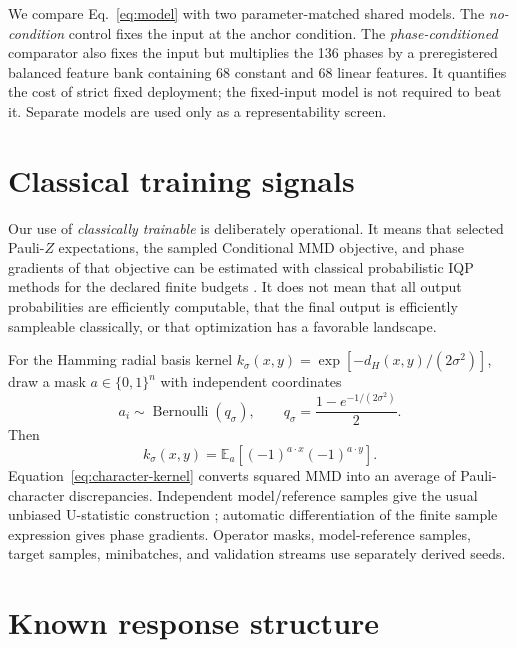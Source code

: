 \documentclass[a4paper,twocolumn,11pt,unpublished]{quantumarticle}
\newcommand{\bits}{\{0,1\}}
\newcommand{\E}{\mathbb{E}}
\begin{document}
We compare Eq.~\eqref{eq:model} with two parameter-matched shared models.  The
\emph{no-condition} control fixes the input at the anchor condition.  The
\emph{phase-conditioned} comparator also fixes the input but multiplies the
136 phases by a preregistered balanced feature bank containing 68 constant and
68 linear features.  It quantifies the cost of strict fixed deployment; the
fixed-input model is not required to beat it.  Separate models are used only as
a representability screen.

\section{Classical training signals}
\label{sec:training}

Our use of \emph{classically trainable} is deliberately operational.  It means
that selected Pauli-$Z$ expectations, the sampled Conditional MMD objective,
and phase gradients of that objective can be estimated with classical
probabilistic IQP methods for the declared finite budgets
\cite{nestSimulatingQuantumComputers2011,
recio-armengolIQPoptFastOptimization2025,
recio-armengolTrainClassicalDeploy2026}.  It does not mean that all output
probabilities are efficiently computable, that the final output is efficiently
sampleable classically, or that optimization has a favorable landscape.

For the Hamming radial basis kernel
$k_\sigma(x,y)=\exp[-d_H(x,y)/(2\sigma^2)]$, draw a mask
$a\in\bits^n$ with independent coordinates
\begin{equation}
 a_i\sim\operatorname{Bernoulli}(q_\sigma),\qquad
 q_\sigma=\frac{1-e^{-1/(2\sigma^2)}}{2}.
 \label{eq:mask-law}
\end{equation}
Then
\begin{equation}
 k_\sigma(x,y)=\E_a\left[(-1)^{a\cdot x}(-1)^{a\cdot y}\right].
 \label{eq:character-kernel}
\end{equation}
Equation~\eqref{eq:character-kernel} converts squared MMD into an average of
Pauli-character discrepancies.  Independent model/reference samples give the
usual unbiased U-statistic construction
\cite{grettonKernelTwoSample2012}; automatic differentiation of the finite
sample expression gives phase gradients.  Operator masks, model-reference
samples, target samples, minibatches, and validation streams use separately
derived seeds.

\section{Known response structure}
\label{sec:response}
\end{document}
